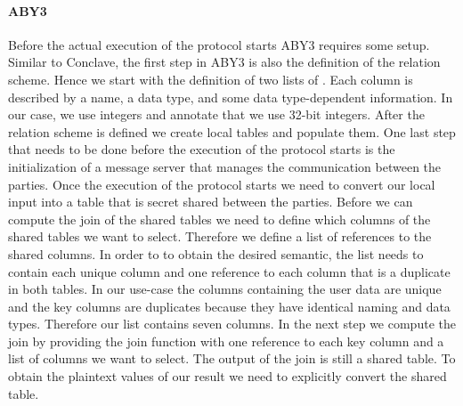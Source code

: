 \paragraph{ABY3}
Before the actual execution of the protocol starts ABY3 requires some setup. Similar to Conclave, the first step in ABY3 is also the definition of the relation scheme. Hence we start with the definition of two lists of \cite{ColumnInfos}. Each column is described by a name, a data type, and some data type-dependent information. In our case, we use integers and annotate that we use 32-bit integers. After the relation scheme is defined we create local tables and populate them. One last step that needs to be done before the execution of the protocol starts is the initialization of a message server that manages the communication between the parties.
Once the execution of the protocol starts we need to convert our local input into a table that is secret shared between the parties. 
Before we can compute the join of the shared tables we need to define which columns of the shared tables we want to select. Therefore we define a list of references to the shared columns. In order to to obtain the desired semantic, the list needs to contain each unique column and one reference to each column that is a duplicate in both tables. 
In our use-case the columns containing the user data are unique and the key columns are duplicates because they have identical naming and data types. Therefore our list contains seven columns. In the next step we compute the join by providing the join function with one reference to each key column and a list of columns we want to select. The output of the join is still a shared table. To obtain the plaintext values of our result we need to explicitly convert the shared table.  


